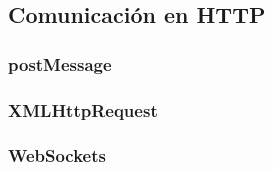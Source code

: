 \subsection{Comunicación en HTTP}
\label{chap:comunHTTP}

\subsubsection{postMessage}
\label{chap:postmessage}

\subsubsection{XMLHttpRequest}
\label{XMLHR}

\subsubsection{WebSockets}
\label{WebSockets}

